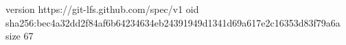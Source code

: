 version https://git-lfs.github.com/spec/v1
oid sha256:bec4a32dd2f84af6b64234634eb24391949d1341d69a617e2c16353d83f79a6a
size 67
